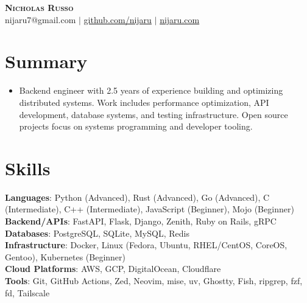 \documentclass[letterpaper,10pt]{article}
\begin{document}
\begin{center}
    \textbf{\huge \scshape Nicholas Russo} \\ \vspace{2pt}
    \small nijaru7@gmail.com $|$
    \href{https://github.com/nijaru}{github.com/nijaru} $|$
    \href{https://nijaru.com}{nijaru.com}
\end{center}
\vspace{-8pt}

\section{Summary}
\begin{itemize}[leftmargin=0.15in, label={}]
    \item
    \setlength{\baselineskip}{14pt}
    Backend engineer with 2.5 years of experience building and optimizing distributed systems. Work includes performance optimization, API development, database systems, and testing infrastructure. Open source projects focus on systems programming and developer tooling.
    \setlength{\baselineskip}{12pt}
\end{itemize}
\vspace{-3pt}

\section{Skills}
\begin{itemize}[leftmargin=0.15in, label={}]
    \small{\item{
     \textbf{Languages}{: Python (Advanced), Rust (Advanced), Go (Advanced), C (Intermediate), C++ (Intermediate), JavaScript (Beginner), Mojo (Beginner)} \\[2pt]
     \textbf{Backend/APIs}{: FastAPI, Flask, Django, Zenith, Ruby on Rails, gRPC} \\[2pt]
     \textbf{Databases}{: PostgreSQL, SQLite, MySQL, Redis} \\[2pt]
     \textbf{Infrastructure}{: Docker, Linux (Fedora, Ubuntu, RHEL/CentOS, CoreOS, Gentoo), Kubernetes (Beginner)} \\[2pt]
     \textbf{Cloud Platforms}{: AWS, GCP, DigitalOcean, Cloudflare} \\[2pt]
     \textbf{Tools}{: Git, GitHub Actions, Zed, Neovim, mise, uv, Ghostty, Fish, ripgrep, fzf, fd, Tailscale}
    }}
\end{itemize}
\end{document}
